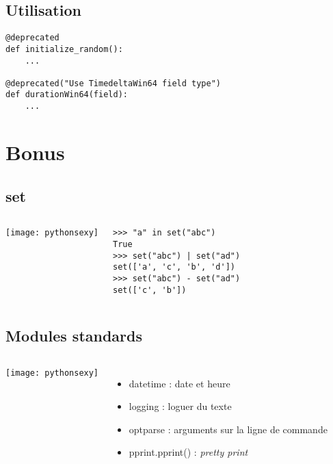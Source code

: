 \documentclass[handout]{beamer}
\begin{document}
\subsection{Utilisation}
\begin{frame}[fragile]
\begin{verbatim}
@deprecated
def initialize_random():
    ...

@deprecated("Use TimedeltaWin64 field type")
def durationWin64(field):
    ...
\end{verbatim}
\end{frame}

\section{Bonus}

\subsection{set}
\begin{frame}[fragile]
    \begin{columns}[c]
        \texttt{[image: pythonsexy]}
        \begin{verbatim}
>>> "a" in set("abc")
True
>>> set("abc") | set("ad")
set(['a', 'c', 'b', 'd'])
>>> set("abc") - set("ad")
set(['c', 'b'])
        \end{verbatim}
    \end{columns}
\end{frame}

\subsection{Modules standards}
\begin{frame}
    \begin{columns}[c]
        \texttt{[image: pythonsexy]}
        \begin{itemize}
        \item datetime : date et heure
        \item logging : loguer du texte
        \item optparse : arguments sur la ligne de commande
        \item pprint.pprint() : \textit{pretty print}
        \end{itemize}
    \end{columns}
\end{frame}
\end{document}
